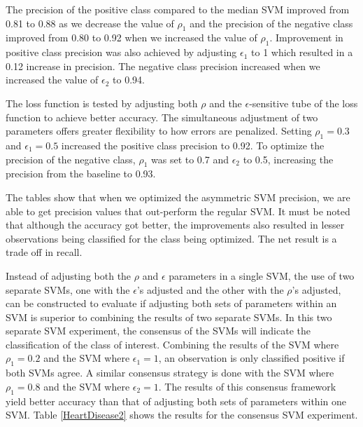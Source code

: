 The precision of the positive class compared to the median SVM improved from 0.81 to 0.88 as we decrease the value of $\rho_1$ and the precision of the negative class improved from 0.80 to 0.92 when we increased the value of $\rho_1$. Improvement in positive class precision was also achieved by adjusting $\epsilon_1$ to 1 which resulted in a 0.12 increase in precision. The negative class precision increased when we increased the value of $\epsilon_2$ to 0.94. 


The loss function is tested by adjusting both $\rho$ and the $\epsilon$-sensitive tube of the loss function to achieve better accuracy. The simultaneous adjustment of two parameters offers greater flexibility to how errors are penalized. Setting $\rho_1=0.3$ and $\epsilon_1=0.5$ increased the positive class precision to 0.92. To optimize the precision of the negative class, $\rho_1$ was set to 0.7 and $\epsilon_2$ to 0.5, increasing the precision from the baseline to 0.93. 

The tables show that when we optimized the asymmetric SVM precision, we are able to get precision values that out-perform the regular SVM. It must be noted that although the accuracy got better, the improvements also resulted in lesser observations being classified for the class being optimized. The net result is a trade off in recall. 

Instead of adjusting both the $\rho$ and $\epsilon$ parameters in a single SVM, the use of two separate SVMs, one with the $\epsilon$'s adjusted and the other with the $\rho$'s adjusted, can be constructed to evaluate if adjusting both sets of parameters within an SVM is superior to combining the results of two separate SVMs. In this two separate SVM experiment, the consensus of the SVMs will indicate the classification of the class of interest. Combining the results of the SVM where $\rho_1=0.2$ and the SVM where $\epsilon_1=1$, an observation is only classified positive if both SVMs agree. A similar consensus strategy is done with the SVM where $\rho_1=0.8$ and the SVM where $\epsilon_2=1$. The results of this consensus framework yield better accuracy than that of adjusting both sets of parameters within one SVM. Table \ref{HeartDisease2} shows the results for the consensus SVM experiment. 

